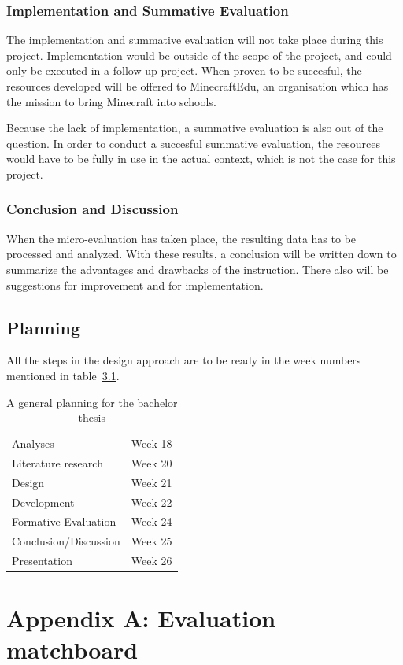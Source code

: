 \documentclass[12pt]{report} %
\begin{document}
\section{Implementation and Summative Evaluation}

The implementation and summative evaluation will not take place during this project. Implementation would be outside of the scope of the project, and could only be executed in a follow-up project. When proven to be succesful, the resources developed will be offered to MinecraftEdu, an organisation which has the mission to bring Minecraft into schools.

Because the lack of implementation, a summative evaluation is also out of the question. In order to conduct a succesful summative evaluation, the resources would have to be fully in use in the actual context, which is not the case for this project.

\section{Conclusion and Discussion}

When the micro-evaluation has taken place, the resulting data has to be processed and analyzed. With these results, a conclusion will be written down to summarize the advantages and drawbacks of the instruction. There also will be suggestions for improvement and for implementation.

\chapter{Planning}

All the steps in the design approach are to be ready in the week numbers mentioned in table~\ref{tab:planning}.

\begin{table}[h]
\begin{center}
\begin{tabular}{ l r }
Analyses & Week 18 \\
Literature research & Week 20 \\
Design & Week 21 \\
Development & Week 22 \\
Formative Evaluation & Week 24 \\
Conclusion/Discussion & Week 25 \\
Presentation & Week 26 \\
\end{tabular}
\end{center}
\caption{A general planning for the bachelor thesis \label{tab:planning}}
\end{table}




\part{Appendix A: Evaluation matchboard}


\end{document}
